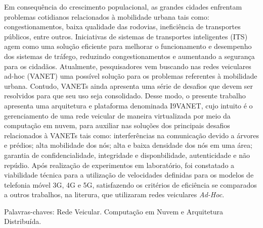 \documentclass[
	12pt,				%
	oneside,			%
	a4paper,			%
	english,			%
	brazil				%
	]{abntex2ppgsi}
\begin{document}
\begin{resumo}
Em consequência do crescimento populacional, as grandes cidades enfrentam problemas cotidianos relacionados à mobilidade urbana tais como: congestionamentos, baixa qualidade das rodovias, ineficiência de transportes públicos, entre outros. Iniciativas de sistemas de transportes inteligentes (ITS) agem como uma solução eficiente para melhorar o funcionamento e desempenho dos sistemas de tráfego, reduzindo congestionamentos e aumentando a segurança para os cidadãos. Atualmente, pesquisadores vem buscando nas redes veiculares ad-hoc (VANET) uma possível solução para os problemas referentes à mobilidade urbana. Contudo, VANETs ainda apresenta uma série de desafios que devem ser resolvidos para que seu uso seja consolidado.  Desse modo, o presente trabalho apresenta uma arquitetura e plataforma denominada I9VANET, cujo intuito é o gerenciamento de uma rede veicular de maneira virtualizada por meio da computação em nuvem, para auxiliar nas soluções dos principais desafios relacionados à VANETs tais como: interferências na comunicação devido a árvores e prédios;  alta mobilidade dos nós; alta e baixa densidade dos nós em uma área; garantia de confidencialidade, integridade e disponbilidade, autenticidade e não repúdio. Após realização de experimentos em laboratório, foi constatado a viabilidade técnica para a utilização de velocidades definidas para os modelos de telefonia móvel 3G, 4G e 5G, satisfazendo os critérios de eficiência se comparados a outros trabalhos, na literura, que utilizaram redes veiculares \textit{Ad-Hoc}.
 
Palavras-chaves: Rede Veicular. Computação em Nuvem e Arquitetura Distribuída.

\end{resumo}
\end{document}
